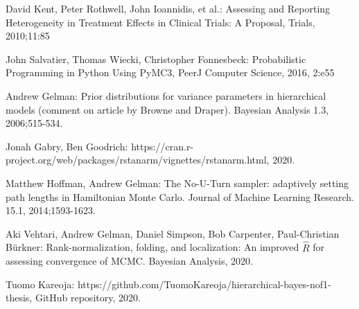\documentclass[12pt,a4paper,leqno]{report}
\theoremstyle{plain}
\theoremstyle{definition}
\theoremstyle{remark}
\begin{document}
\begin{thebibliography}{4}
    David Kent, Peter Rothwell, John Ioannidis, et al.: Assessing and Reporting Heterogeneity in
    Treatment Effects in Clinical Trials: A Proposal, Trials, 2010;11:85

    John Salvatier, Thomas Wiecki, Christopher Fonnesbeck: Probabilistic Programming in Python Using PyMC3, PeerJ Computer
    Science, 2016, 2:e55

    Andrew Gelman: Prior distributions for variance parameters in hierarchical models
    (comment on article by Browne and Draper). Bayesian Analysis 1.3, 2006;515-534.

    Jonah Gabry, Ben Goodrich:
    https://cran.r-project.org/web/packages/rstanarm/vignettes/rstanarm.html, 2020.
    
    Matthew Hoffman, Andrew Gelman: The No-U-Turn sampler: adaptively setting path
    lengths in Hamiltonian Monte Carlo. Journal of Machine Learning Research. 15.1,
    2014;1593-1623.
    
    Aki Vehtari, Andrew Gelman, Daniel Simpson, Bob Carpenter, Paul-Christian Bürkner:
    Rank-normalization, folding, and localization: An improved $\widehat {R} $ for
    assessing convergence of MCMC. Bayesian Analysis, 2020.

    Tuomo Kareoja: https://github.com/TuomoKareoja/hierarchical-bayes-nof1-thesis,
    GitHub repository, 2020.

\end{thebibliography}
\end{document}
